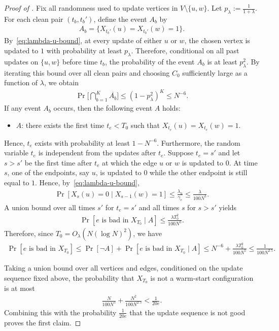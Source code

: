 \documentclass[11pt]{amsart}
\renewcommand{\Pr}{\mathop{\mathrm{Pr}}\nolimits}
\newcommand{\defeq}{:=}
\theoremstyle{definition}
\theoremstyle{remark}
\begin{document}
\begin{proof}[Proof of ]
Fix all randomness used to update vertices in $V \setminus \{u,w\}$.
Let $p_\lambda \defeq \frac{1}{1+\lambda}$. For each clean pair $(t_b,t_b')$, define the event $A_b$ by
\begin{align*}
A_b = \{X_{t_b'}(u) = X_{t_b'}(w) = 1\}.
\end{align*}
By~\eqref{eq:lambda-u-bound}, at every update of either $u$ or $w$, the chosen vertex is updated to $1$ with probability at least $p_\lambda$. Therefore, conditional on all past updates on $\{u,w\}$ before time $t_b$, the probability of the event $A_b$ is at least $p_\lambda^2$.
By iterating this bound over all clean pairs and choosing $C_0$ sufficiently large as a function of $\lambda$, we obtain
\begin{align*}
\Pr\Big[\bigcap_{b = 1}^K \overline{A_b}\Big] \leq (1-p_\lambda^2)^K \leq N^{-6}.
\end{align*}
If any event $A_b$ occurs, then the following event $A$ holds:
\begin{itemize}
\item $A$: there exists the first time $t_e < T_0$ such that $X_{t_e}(u) = X_{t_e}(w) = 1$.
\end{itemize}
Hence, $t_e$ exists with probability at least $1 - N^{-6}$. Furthermore, the random variable $t_e$ %
is independent from the updates after $t_e$.
Suppose $t_e = s'$ and let $s > s'$ be the first time after $t_e$ at which the edge $u$ or $w$ is updated to $0$.
At time $s$, one of the endpoints, say $u$, is updated to $0$ while the other endpoint is still equal to $1$. Hence, by~\eqref{eq:lambda-u-bound},
\begin{align*}
\Pr[X_s(u) = 0 \mid X_{s-1}(w) = 1] \leq \frac{\lambda_u}{\gamma_e} \leq \frac{\lambda}{100N^5}.
\end{align*}
A union bound over all times $s'$ for $t_e = s'$ and all times $s$ for $s > s'$ yields
\begin{align*}
\Pr[e \text{ is bad in } X_{T_0} \mid A] \leq \frac{\lambda T_0^2}{100N^5}.
\end{align*}
Therefore, since $T_0 = O_\lambda(N(\log N)^2)$, we have
\begin{align*}
\Pr[e \text{ is bad in } X_{T_0}] \leq \Pr[\neg A] + \Pr[e \text{ is bad in } X_{T_0} \mid A] \leq N^{-6} + \frac{\lambda T_0^2}{100N^5} \leq \frac{1}{100N^{2.5}}.
\end{align*}

Taking a union bound over all vertices and edges, conditioned on the update sequence fixed above, the probability that $X_{T_0}$ is not a warm-start configuration is at most
\begin{align}\label{eq:warm-start-configuration-probability}
\frac{N}{100N^5} + \frac{N^2}{100N^{2.5}} < \frac{1}{20e}.
\end{align}
Combining this with the probability $\frac{1}{20e}$ that the update sequence is not good proves the first claim.


\end{proof}
\end{document}
